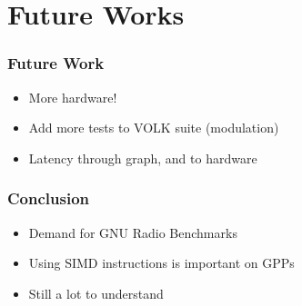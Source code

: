 \documentclass{beamer}
\begin{document}
\section*{Future Works}
\begin{frame}
  \frametitle{Future Work}
  \begin{itemize}
    \item More hardware!
    \item Add more tests to VOLK suite (modulation)
    \item Latency through graph, and to hardware
  \end{itemize}
\end{frame}

\begin{frame}
  \frametitle{Conclusion}
  \begin{itemize}
    \item Demand for GNU Radio Benchmarks
    \item Using SIMD instructions is important on GPPs
    \item Still a lot to understand
  \end{itemize}
\end{frame}
\end{document}
